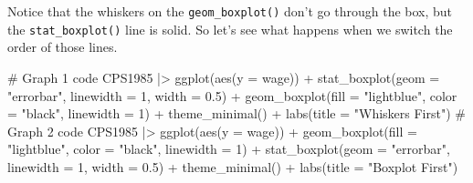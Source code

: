 \documentclass[
  letterpaper,
]{book}
\newenvironment{Shaded}{\begin{snugshade}}{\end{snugshade}}
\newcommand{\AttributeTok}[1]{\textcolor[rgb]{0.40,0.45,0.13}{#1}}
\newcommand{\CommentTok}[1]{\textcolor[rgb]{0.37,0.37,0.37}{#1}}
\newcommand{\DecValTok}[1]{\textcolor[rgb]{0.68,0.00,0.00}{#1}}
\newcommand{\FloatTok}[1]{\textcolor[rgb]{0.68,0.00,0.00}{#1}}
\newcommand{\FunctionTok}[1]{\textcolor[rgb]{0.28,0.35,0.67}{#1}}
\newcommand{\NormalTok}[1]{\textcolor[rgb]{0.00,0.23,0.31}{#1}}
\newcommand{\SpecialCharTok}[1]{\textcolor[rgb]{0.37,0.37,0.37}{#1}}
\newcommand{\StringTok}[1]{\textcolor[rgb]{0.13,0.47,0.30}{#1}}
\begin{document}
\begin{tcolorbox}
\begin{figure}[H]
\begin{minipage}{0.50\linewidth}
\begin{figure}[H]
{}


\end{figure}%

\end{minipage}%

\end{figure}%

Notice that the whiskers on the \texttt{geom\_boxplot()} don't go
through the box, but the \texttt{stat\_boxplot()} line is solid. So
let's see what happens when we switch the order of those lines.

\begin{Shaded}
\begin{Highlighting}[]
\CommentTok{\# Graph 1 code}
\NormalTok{CPS1985 }\SpecialCharTok{|\textgreater{}} 
  \FunctionTok{ggplot}\NormalTok{(}\FunctionTok{aes}\NormalTok{(}\AttributeTok{y =}\NormalTok{ wage)) }\SpecialCharTok{+}
  \FunctionTok{stat\_boxplot}\NormalTok{(}\AttributeTok{geom =} \StringTok{"errorbar"}\NormalTok{, }\AttributeTok{linewidth =} \DecValTok{1}\NormalTok{, }\AttributeTok{width =} \FloatTok{0.5}\NormalTok{) }\SpecialCharTok{+} 
  \FunctionTok{geom\_boxplot}\NormalTok{(}\AttributeTok{fill =} \StringTok{"lightblue"}\NormalTok{, }\AttributeTok{color =} \StringTok{"black"}\NormalTok{, }\AttributeTok{linewidth =} \DecValTok{1}\NormalTok{) }\SpecialCharTok{+}
  \FunctionTok{theme\_minimal}\NormalTok{() }\SpecialCharTok{+}
  \FunctionTok{labs}\NormalTok{(}\AttributeTok{title =} \StringTok{"Whiskers First"}\NormalTok{)}
\CommentTok{\# Graph 2 code  }
\NormalTok{CPS1985 }\SpecialCharTok{|\textgreater{}} 
  \FunctionTok{ggplot}\NormalTok{(}\FunctionTok{aes}\NormalTok{(}\AttributeTok{y =}\NormalTok{ wage)) }\SpecialCharTok{+}
  \FunctionTok{geom\_boxplot}\NormalTok{(}\AttributeTok{fill =} \StringTok{"lightblue"}\NormalTok{, }\AttributeTok{color =} \StringTok{"black"}\NormalTok{, }\AttributeTok{linewidth =} \DecValTok{1}\NormalTok{) }\SpecialCharTok{+}
  \FunctionTok{stat\_boxplot}\NormalTok{(}\AttributeTok{geom =} \StringTok{"errorbar"}\NormalTok{, }\AttributeTok{linewidth =} \DecValTok{1}\NormalTok{, }\AttributeTok{width =} \FloatTok{0.5}\NormalTok{) }\SpecialCharTok{+} 
  \FunctionTok{theme\_minimal}\NormalTok{() }\SpecialCharTok{+}
  \FunctionTok{labs}\NormalTok{(}\AttributeTok{title =} \StringTok{"Boxplot First"}\NormalTok{)}
\end{Highlighting}
\end{Shaded}

\begin{figure}[H]


\end{figure}
\end{tcolorbox}
\end{document}
